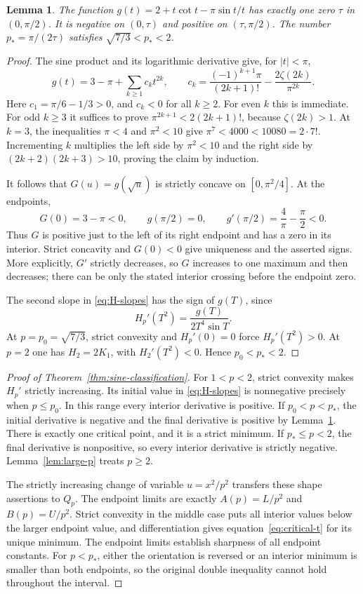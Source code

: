 \documentclass[11pt,a4paper]{article}
\numberwithin{equation}{section}
\newtheorem{lemma}[theorem]{Lemma}
\theoremstyle{remark}
\begin{document}
\begin{lemma}\label{lem:transition}
The function $g(t)=2+t\cot t-\pi\sin t/t$ has exactly one zero
$\tau$ in $(0,\pi/2)$. It is negative on $(0,\tau)$ and positive
on $(\tau,\pi/2)$. The number $p_*=\pi/(2\tau)$ satisfies
$\sqrt{7/3}<p_*<2$.
\end{lemma}

\begin{proof}
The sine product and its logarithmic derivative give, for $|t|<\pi$,
\[
 g(t)=3-\pi+\sum_{k\ge1}c_kt^{2k},\qquad
 c_k=\frac{(-1)^{k+1}\pi}{(2k+1)!}
       -\frac{2\zeta(2k)}{\pi^{2k}}.
\]
Here $c_1=\pi/6-1/3>0$, and $c_k<0$ for all $k\ge2$.
For even $k$ this is immediate. For odd $k\ge3$ it suffices to
prove $\pi^{2k+1}<2(2k+1)!$, because $\zeta(2k)>1$.
At $k=3$, the inequalities $\pi<4$ and $\pi^2<10$ give
$\pi^7<4000<10080=2\cdot7!$. Incrementing $k$ multiplies the
left side by $\pi^2<10$ and the right side by
$(2k+2)(2k+3)>10$, proving the claim by induction.

It follows that $G(u)=g(\sqrt u)$ is strictly concave on
$[0,\pi^2/4]$. At the endpoints,
\[
 G(0)=3-\pi<0,\qquad g(\pi/2)=0,
 \qquad g'(\pi/2)=\frac4\pi-\frac\pi2<0.
\]
Thus $G$ is positive just to the left of its right endpoint and
has a zero in its interior. Strict concavity and $G(0)<0$ give
uniqueness and the asserted signs. More explicitly, $G'$ strictly
decreases, so $G$ increases to one maximum and then decreases;
there can be only the stated interior crossing before the endpoint
zero.

The second slope in \eqref{eq:H-slopes} has the sign of $g(T)$,
since
\[
 H_p'(T^2)=\frac{g(T)}{2T^4\sin T}.
\]
At $p=p_0=\sqrt{7/3}$, strict convexity and $H_p'(0)=0$
force $H_p'(T^2)>0$. At $p=2$ one has $H_2=2K_1$, with
$H_2'(T^2)<0$. Hence $p_0<p_*<2$.
\end{proof}

\begin{proof}[Proof of Theorem~\ref{thm:sine-classification}]
For $1<p<2$, strict convexity makes $H_p'$ strictly increasing.
Its initial value in \eqref{eq:H-slopes} is nonnegative precisely
when $p\le p_0$. In this range every interior derivative is
positive. If $p_0<p<p_*$, the initial derivative is negative and
the final derivative is positive by Lemma~\ref{lem:transition}.
There is exactly one critical point, and it is a strict minimum.
If $p_*\le p<2$, the final derivative is nonpositive, so every
interior derivative is strictly negative. Lemma~\ref{lem:large-p}
treats $p\ge2$.

The strictly increasing change of variable $u=x^2/p^2$ transfers
these shape assertions to $Q_p$. The endpoint limits are exactly
$A(p)=L/p^2$ and $B(p)=U/p^2$. Strict convexity in the middle
case puts all interior values below the larger endpoint value,
and differentiation gives equation~\eqref{eq:critical-t} for its
unique minimum. The endpoint limits establish sharpness of all
endpoint constants. For $p<p_*$, either the orientation is reversed
or an interior minimum is smaller than both endpoints, so the
original double inequality cannot hold throughout the interval.
\end{proof}
\end{document}
